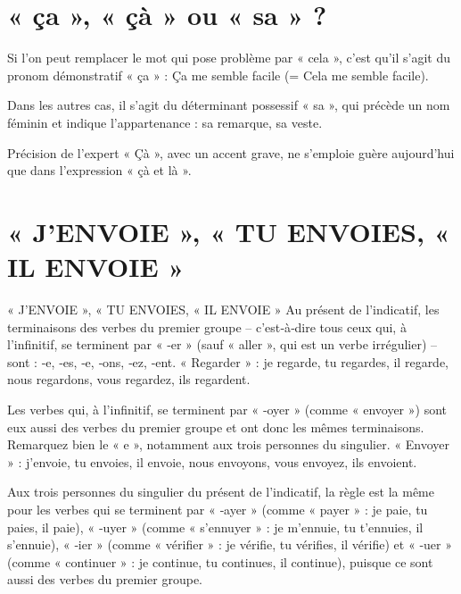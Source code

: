  



\maketitle
\tableofcontents

\section{« ça », « çà » ou « sa » ?}

Si l'on peut remplacer le mot qui pose problème par « cela », c'est qu'il s'agit du pronom démonstratif « ça » : Ça me semble facile (= Cela me semble facile). \newline

Dans les autres cas, il s'agit du déterminant possessif « sa », qui précède un nom féminin et indique l'appartenance : sa remarque, sa veste. \newline

Précision de l'expert
« Çà », avec un accent grave, ne s'emploie guère aujourd'hui que dans l'expression « çà et là ».


\section{« J'ENVOIE », « TU ENVOIES, « IL ENVOIE »}
« J'ENVOIE », « TU ENVOIES, « IL ENVOIE »
Au présent de l'indicatif, les terminaisons des verbes du premier groupe – c'est‑à‑dire tous ceux qui, à l'infinitif, se terminent par « ‑er » (sauf « aller », qui est un verbe irrégulier) – sont : ‑e, ‑es, ‑e, ‑ons, ‑ez, ‑ent.
« Regarder » : je regarde, tu regardes, il regarde, nous regardons, vous regardez, ils regardent.

Les verbes qui, à l'infinitif, se terminent par « ‑oyer » (comme « envoyer ») sont eux aussi des verbes du premier groupe et ont donc les mêmes terminaisons.
Remarquez bien le « e », notamment aux trois personnes du singulier.
« Envoyer » : j'envoie, tu envoies, il envoie, nous envoyons, vous envoyez, ils envoient.

Aux trois personnes du singulier du présent de l'indicatif, la règle est la même pour les verbes qui se terminent par « ‑ayer » (comme « payer » : je paie, tu paies, il paie), « ‑uyer » (comme « s'ennuyer » : je m'ennuie, tu t'ennuies, il s'ennuie), « ‑ier » (comme « vérifier » : je vérifie, tu vérifies, il vérifie) et « ‑uer » (comme « continuer » : je continue, tu continues, il continue), puisque ce sont aussi des verbes du premier groupe.

